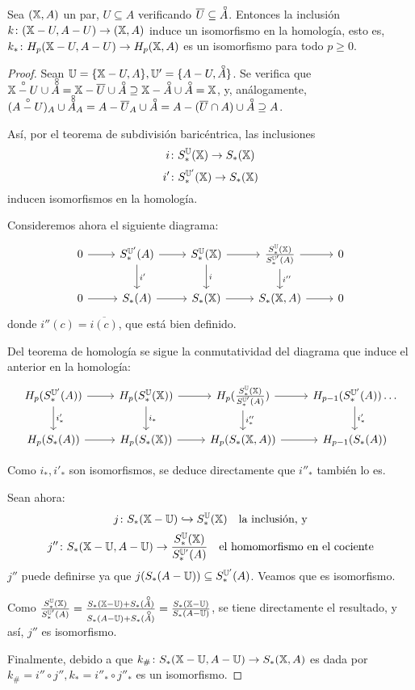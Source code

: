 \begin{theorem}
  Sea $({\mathbb X}, A)$ un par, $U \subseteq A$ verificando $\overline{U} \subseteq \interior{A}$. Entonces la inclusión
  $k \colon ({\mathbb X} - U, A - U) \to ({\mathbb X}, A)$ induce un isomorfismo en la homología, esto es, $k_* \colon H_p({\mathbb X} - U, A - U) \to H_p({\mathbb X}, A)$
  es un isomorfismo para todo $p \geq 0$.
\end{theorem}

\begin{proof}
  Sean $\U = \{\X - U, A\}, \U' = \{A - U, \interior{A}\}$. Se verifica que $\interior{\X-U} \cup \interior{\interior{A}} = \X - \overline{U} \cup \interior{A}
  \supseteq \X - \interior{A} \cup \interior{A} = \X$, y, análogamente, $(\interior{A - U})_A \cup \interior{\interior{A}}_A = A - \overline{U}_A \cup \interior{A} =
  A - (\overline{U} \cap A) \cup \interior{A} \supseteq A$.

  Así, por el teorema de subdivisión baricéntrica, las inclusiones
  \[i \colon S_*^{\mathbb U}({\mathbb X}) \to S_*({\mathbb X}) \]
  \[i' \colon S_*^{{\mathbb U}'}({\mathbb X}) \to S_*({\mathbb X}) \]
  inducen isomorfismos en la homología.

  Consideremos ahora el siguiente diagrama:
  \[ \begin{tikzcd}
  0 \arrow{r} & S_*^{\U'}(A) \arrow{r} \arrow{d}{i'} & S_*^{\U}(\X) \arrow{r} \arrow{d}{i} & \frac{S_*^{\U}(\X)}{S_*^{\U'}(A)} \arrow{r} \arrow{d}{i''} & 0 \\
  0 \arrow{r} & S_*(A) \arrow{r} & S_*(\X) \arrow{r} & S_*(\X, A) \arrow{r} & 0
  \end{tikzcd} \]
  donde $i''(c) = \overline{i(c)}$, que está bien definido.

  Del teorema de homología se sigue la conmutatividad del diagrama que induce el anterior en la homología:
  \[ \begin{tikzcd}
  H_p(S_*^{\U'}(A)) \arrow{r} \arrow{d}{i'_*} & H_p(S_*^{\U}(\X)) \arrow{r} \arrow{d}{i_*} & H_p(\frac{S_*^{\U}(\X)}{S_*^{\U'}(A)}) \arrow{r} \arrow{d}{i''_*} & H_{p-1}(S_*^{\U'}(A)) \arrow{d}{i'_*} \dots \\
  H_p(S_*(A)) \arrow{r} & H_p(S_*(\X)) \arrow{r} & H_p(S_*(\X, A)) \arrow{r} & H_{p-1}(S_*(A))
  \end{tikzcd} \]

  Como $i_*, i'_*$ son isomorfismos, se deduce directamente que $i''_*$ también lo es.

  Sean ahora:
  \[j \colon S_*({\mathbb X} - {\mathbb U}) \xhookrightarrow{}   S_*^{\mathbb U}({\mathbb X}) \quad \text{la inclusión, y} \]
  \[j'' \colon S_*({\mathbb X} - {\mathbb U}, A - {\mathbb U}) \to \frac{S_*^{{\mathbb U}}({\mathbb X})}{S_*^{{\mathbb U}'}(A)} \quad \text{el homomorfismo en el cociente}\]
  $j''$ puede definirse ya que $j(S_*(A - {\mathbb U})) \subseteq S_*^{{\mathbb U}'}(A)$. Veamos que es isomorfismo.

  Como $\frac{S_*^{\U}(\X)}{S_*^{\U'}(A)} = \frac{S_*(\X - \U) + S_*(\interior{A})}{S_*(A - \U) + S_*(\interior{A})} = \frac{S_*(\X-\U)}{S_*(A-\U)}$, se tiene
  directamente el resultado, y así, $j''$ es isomorfismo.

  Finalmente, debido a que $k_\# \colon S_*({\mathbb X}-{\mathbb U}, A-{\mathbb U}) \to S_*({\mathbb X}, A)$ es dada por \\
  $k_\# = i'' \circ j'', k_* = i''_* \circ j''_*$ es un isomorfismo.
\end{proof}

